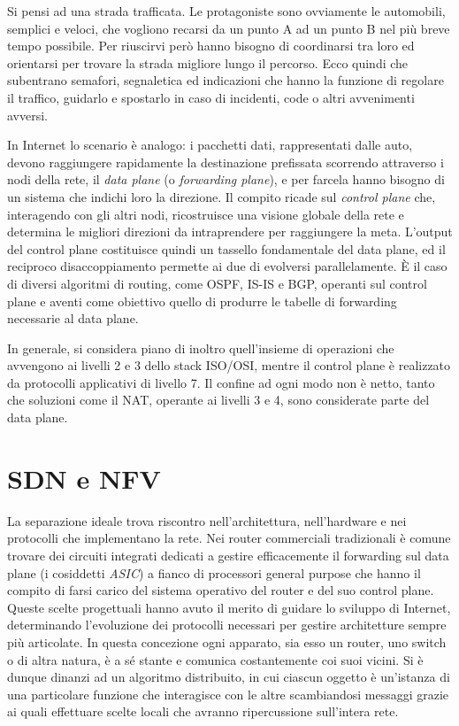 Si pensi ad una strada trafficata. Le protagoniste sono ovviamente le automobili, semplici e veloci, che vogliono recarsi da un punto A ad un punto B nel più breve tempo possibile. Per riuscirvi però hanno bisogno di coordinarsi tra loro ed orientarsi per trovare la strada migliore lungo il percorso. Ecco quindi che subentrano semafori, segnaletica ed indicazioni che hanno la funzione di regolare il traffico, guidarlo e spostarlo in caso di incidenti, code o altri avvenimenti avversi.

In Internet lo scenario è analogo: i pacchetti dati, rappresentati dalle auto, devono raggiungere rapidamente la destinazione prefissata scorrendo attraverso i nodi della rete, il \textit{data plane} (o \textit{forwarding plane}), e per farcela hanno bisogno di un sistema che indichi loro la direzione. Il compito ricade sul \textit{control plane} che, interagendo con gli altri nodi, ricostruisce una visione globale della rete e determina le migliori direzioni da intraprendere per raggiungere la meta. L'output del control plane costituisce quindi un tassello fondamentale del data plane, ed il reciproco disaccoppiamento permette ai due di evolversi parallelamente. È il caso di diversi algoritmi di routing, come OSPF, IS-IS e BGP, operanti sul control plane e aventi come obiettivo quello di produrre le tabelle di forwarding necessarie al data plane.

In generale, si considera piano di inoltro quell'insieme di operazioni che avvengono ai livelli 2 e 3 dello stack ISO/OSI, mentre il control plane è realizzato da protocolli applicativi di livello 7. Il confine ad ogni modo non è netto, tanto che soluzioni come il NAT, operante ai livelli 3 e 4, sono considerate parte del data plane.

\section{SDN e NFV}
\label{sec:sdn-nfv}

La separazione ideale trova riscontro nell'architettura, nell'hardware e nei protocolli che implementano la rete. Nei router commerciali tradizionali è comune trovare dei circuiti integrati dedicati a gestire efficacemente il forwarding sul data plane (i cosiddetti \textit{ASIC}) a fianco di processori general purpose che hanno il compito di farsi carico del sistema operativo del router e del suo control plane. Queste scelte progettuali hanno avuto il merito di guidare lo sviluppo di Internet, determinando l'evoluzione dei protocolli necessari per gestire architetture sempre più articolate. In questa concezione ogni apparato, sia esso un router, uno switch o di altra natura, è a sé stante e comunica costantemente coi suoi vicini. Si è dunque dinanzi ad un algoritmo distribuito, in cui ciascun oggetto è un'istanza di una particolare funzione che interagisce con le altre scambiandosi messaggi grazie ai quali effettuare scelte locali che avranno ripercussione sull'intera rete.

